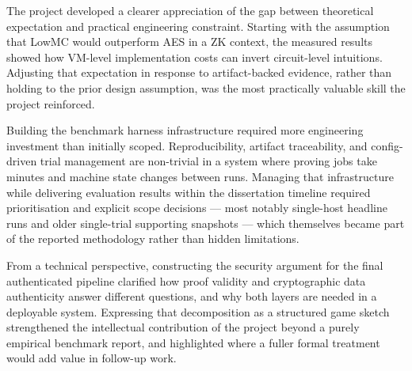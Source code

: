 The project developed a clearer appreciation of the gap between theoretical
expectation and practical engineering constraint. Starting with the assumption
that LowMC would outperform AES in a ZK context, the measured results showed how
VM-level implementation costs can invert circuit-level intuitions. Adjusting that
expectation in response to artifact-backed evidence, rather than holding to the
prior design assumption, was the most practically valuable skill the project
reinforced.

Building the benchmark harness infrastructure required more engineering investment
than initially scoped. Reproducibility, artifact traceability, and config-driven
trial management are non-trivial in a system where proving jobs take minutes and
machine state changes between runs. Managing that infrastructure while delivering
evaluation results within the dissertation timeline required prioritisation and
explicit scope decisions --- most notably single-host headline runs and older
single-trial supporting snapshots --- which themselves became part of the reported
methodology rather than hidden limitations.

From a technical perspective, constructing the security argument for the final
authenticated pipeline clarified how proof validity and cryptographic data
authenticity answer different questions, and why both layers are needed in a
deployable system. Expressing that decomposition as a structured game sketch
strengthened the intellectual contribution of the project beyond a purely
empirical benchmark report, and highlighted where a fuller formal treatment would
add value in follow-up work.

